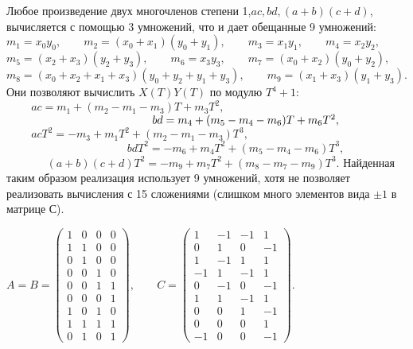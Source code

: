 \documentclass{../../template/mai_book}
\begin{document}
Любое произведение двух многочленов степени 1,$ac,bd,(a + b)(c + d)$, вычисляется с помощью 3 умножений, что и дает обещанные 9 умно­жений: \newline \newline \indent
$
m_1 = x_0 y_0,\qquad m_2 = (x_0 + x_1)(y_0 + y_1), \qquad m_3 = x_1 y_1, \qquad  m_4 = x_2 y_2, $ \newline \indent
$ m_5 = (x_2 + x_3)(y_2 + y_3), \qquad  m_6 = x_3 y_3, \qquad  m_7 = (x_0 + x_2)(y_0 + y_2), $ \newline \indent
$m_8 = (x_0 + x_2 + x_1 + x_3)(y_0 + y_2 + y_1 + y_3), \qquad m_9 = (x_1 + x_3)(y_1 + y_3).$
\newline \newline
Они позволяют вычислить $X(T)Y(T)$ по модулю $T^4 + 1$: \newline \newline  \indent
$
\; \; \; \; \; \; \; \; ac = m_1 + (m_2 - m_1 - m_3)T + m_3 T^2,$ \newline \indent
$ \; \; \; \; \; \; \; \; \; \; \; \; \; \; \; \; \; \; \; \; \; \; \; \; \; \; \; \; \; \; \; \; \; \; \; \; \; \; \; \;\; \; \; \; \; \; \; bd = m_4 + (m_5 - m_4 - m_6)T + m_6 T^2, \\
$ \indent
$\; \; \; \; \; \; \; \; acT^2 = -m_3 + m_1 T^2 + (m_2 - m_1 - m_3)T^3,$ \newline \indent
$\; \; \; \; \; \; \; \; \; \; \; \; \; \; \; \; \; \; \; \; \; \; \; \; \; \; \; \; \; \; \; \; \; \; \; \; \; \; \; bdT^2 = -m_6 + m_4 T^2 + (m_5 - m_4 - m_6)T^3,$ \newline \indent
$\; \; \; \; \; \; \; \; \; \; \; \; \; (a + b)(c + d)T^2 = -m_9 + m_7 T^2 + (m_8 - m_7 - m_9)T^3.$ \newline \newline
Найденная таким образом реализация использует 9 умножений, хотя 
не позволяет реализовать вычисления с 15 сложениями (слишком много элементов вида $\pm 1$ в матрице С). \newline 
\begin{center}$A = B = \begin{pmatrix}
1 & 0 & 0 &0\\
1 & 1 & 0 &0\\         
0 & 1 & 0 &0\\
0 & 0 & 1 &0\\
0 & 0 & 1 &1\\
0 & 0 & 0 &1\\         
1 & 0 & 1 &0\\
1 & 1 & 1 &1\\
0 & 1 & 0 & 1
\end{pmatrix}, \; \; \; \; \; \; \; 
C = \begin{pmatrix}
1 & -1 & -1 &1\\
0 & 1 & 0 & -1\\         
1 & -1 & 1 & 1\\
-1 & 1 & -1 & 1\\
0 & -1 & 0 & -1\\
1 & 1 & -1 & 1\\         
0 & 0 & 1 & -1\\
0 & 0 & 0 & 1\\
-1 & 0 & 0 & -1
\end{pmatrix}.
$
\end{center}
\end{document}
